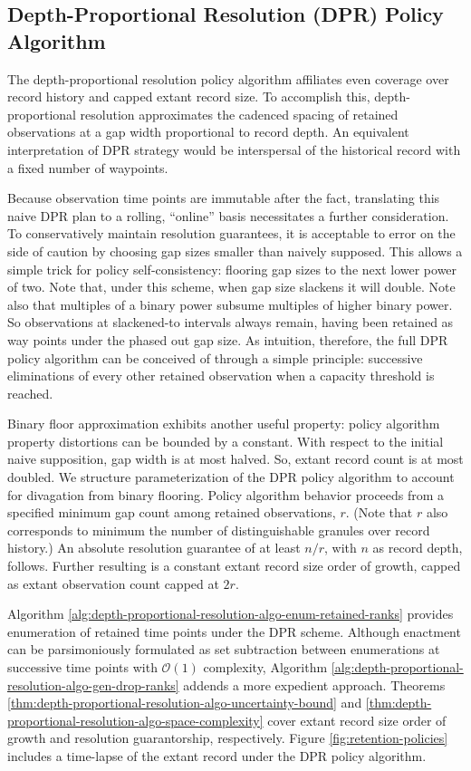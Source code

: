 \subsection{Depth-Proportional Resolution (DPR) Policy Algorithm}
\label{sec:depth-proportional-resolution-algo}

The depth-proportional resolution policy algorithm affiliates even coverage over record history and capped extant record size.
To accomplish this, depth-proportional resolution approximates the cadenced spacing of retained observations at a gap width proportional to record depth.
An equivalent interpretation of DPR strategy would be interspersal of the historical record with a fixed number of waypoints.

Because observation time points are immutable after the fact, translating this naive DPR plan to a rolling, ``online'' basis necessitates a further consideration.
To conservatively maintain resolution guarantees, it is acceptable to error on the side of caution by choosing gap sizes smaller than naively supposed.
This allows a simple trick for policy self-consistency: flooring gap sizes to the next lower power of two.
Note that, under this scheme, when gap size slackens it will double.
Note also that multiples of a binary power subsume multiples of higher binary power.
So observations at slackened-to intervals always remain, having been retained as way points under the phased out gap size.
As intuition, therefore, the full DPR policy algorithm can be conceived of through a simple principle: successive eliminations of every other retained observation when a capacity threshold is reached.

Binary floor approximation exhibits another useful property: policy algorithm property distortions can be bounded by a constant.
With respect to the initial naive supposition, gap width is at most halved.
So, extant record count is at most doubled.
We structure parameterization of the DPR policy algorithm to account for divagation from binary flooring.
Policy algorithm behavior proceeds from a specified minimum gap count among retained observations, $r$.
(Note that $r$ also corresponds to minimum the number of distinguishable granules over record history.)
An absolute resolution guarantee of at least $n/r$, with $n$ as record depth, follows.
Further resulting is a constant extant record size order of growth, capped as extant observation count capped at $2r$.

Algorithm \ref{alg:depth-proportional-resolution-algo-enum-retained-ranks} provides enumeration of retained time points under the DPR scheme.
Although enactment can be parsimoniously formulated as set subtraction between enumerations at successive time points with $\mathcal{O}(1)$ complexity, Algorithm \ref{alg:depth-proportional-resolution-algo-gen-drop-ranks} addends a more expedient approach.
Theorems \ref{thm:depth-proportional-resolution-algo-uncertainty-bound} and \ref{thm:depth-proportional-resolution-algo-space-complexity} cover extant record size order of growth and resolution guarantorship, respectively.
Figure \ref{fig:retention-policies} includes a time-lapse of the extant record under the DPR policy algorithm.

